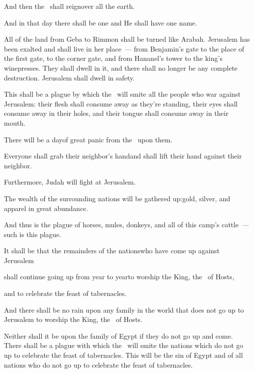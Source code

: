 \begin{inparaenum}
  \pa{} And then the \lord\ shall reign\pa{}over all the earth.%

  \pa{}And in that day there shall be one \lord\pa{}and He shall have one name.%

  \noindent {} All of the land from Geba to Rimmon shall be turned like Arabah. Jerusalem has been exalted and shall live in her place~--- from Benjamin's gate to the place of the first gate, to the corner gate, and from Hananel's tower to the king's winepresses.  They shall dwell in it, and there shall no longer be any complete destruction. Jerusalem shall dwell in safety.%

  \pa{} This shall be a plague by which the \lord\ will smite all the people who war against Jerusalem: their flesh shall consume away as they're standing, their eyes shall consume away in their holes, and their tongue shall consume away in their mouth.%

  \pa{} There will be a day\pa{}of great panic from the \lord\ upon them.%

  \pa{}Everyone shall grab their neighbor's hand\pa{}and shall lift their hand against their neighbor.%

  \pa{} Furthermore, Judah will fight at Jerusalem.%

  \pa{}The wealth of the surrounding nations will be gathered up:\pa{}gold, silver, and apparel in great abundance.%

  \noindent {} And thus is the plague of horses, mules, donkeys, and all of this camp's cattle~--- such is this plague.%

  \pa{} It shall be that the remainders of the nations\pa{}who have come up against Jerusalem%

  \pa{}shall continue going up  from year to year\pa{}to worship the King, the \lord\ of Hosts,%

  \pa{}and to celebrate the feast of tabernacles.%

  \pc{} And there shall be no rain upon any family in the world that does not go up to Jerusalem to worship the King, the \lord\ of Hosts.%

  \pa{} Neither shall it be upon the family of Egypt if they do not go up and come. There shall be a plague with which the \lord\ will smite the nations which do not go up to celebrate the feast of tabernacles.  This will be the sin of Egypt and of all nations who do not go up to celebrate the feast of tabernacles.%


\end{inparaenum}
